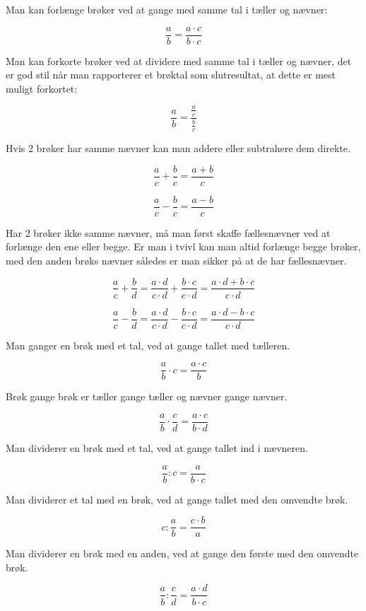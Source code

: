 \documentclass[]{book}
\begin{document}
Man kan forlænge brøker ved at gange med samme tal i tæller og nævner:

\[\frac{a}{b} = \frac{a \cdot c}{b \cdot c}\]

Man kan forkorte brøker ved at dividere med samme tal i tæller og
nævner, det er god stil når man rapporterer et brøktal som slutresultat,
at dette er mest muligt forkortet:

\[\frac{a}{b} = \frac{\frac{a}{c}}{\frac{b}{c}}\]

Hvis 2 brøker har samme nævner kan man addere eller subtrahere dem
direkte.

\[\frac{a}{c} + \frac{b}{c} = \frac{a + b}{c}\]

\[\frac{a}{c} - \frac{b}{c} = \frac{a - b}{c}\]

Har 2 brøker ikke samme nævner, må man først skaffe fællesnævner ved at
forlænge den ene eller begge. Er man i tvivl kan man altid forlænge
begge brøker, med den anden brøks nævner således er man sikker på at de
har fællesnævner.

\[\frac{a}{c} + \frac{b}{d} = \frac{a \cdot d}{c \cdot d} + \frac{b \cdot c}{c \cdot d} = \frac{a \cdot d + b \cdot c}{c \cdot d}\]

\[\frac{a}{c} - \frac{b}{d} = \frac{a \cdot d}{c \cdot d} - \frac{b \cdot c}{c \cdot d} = \frac{a \cdot d - b \cdot c}{c \cdot d}\]

Man ganger en brøk med et tal, ved at gange tallet med tælleren.

\[\frac{a}{b} \cdot c = \frac{a \cdot c}{b}\]

Brøk gange brøk er tæller gange tæller og nævner gange nævner.

\[\frac{a}{b} \cdot \frac{c}{d} = \frac{a \cdot c}{b \cdot d}\]

Man dividerer en brøk med et tal, ved at gange tallet ind i nævneren.

\[\frac{a}{b}:c = \frac{a}{b \cdot c}\]

Man dividerer et tal med en brøk, ved at gange tallet med den omvendte
brøk.

\[c:\frac{a}{b} = \frac{c \cdot b}{a}\]

Man dividerer en brøk med en anden, ved at gange den første med den
omvendte brøk.

\[\frac{a}{b}:\frac{c}{d} = \frac{a \cdot d}{b \cdot c}\]


\end{document}
